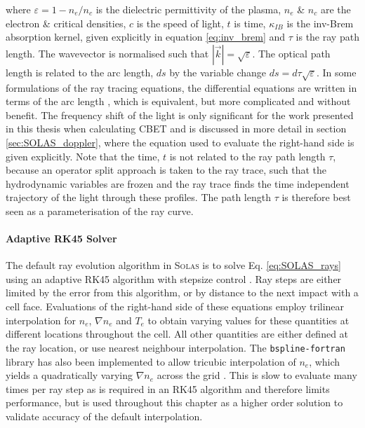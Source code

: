 where $\varepsilon=1-n_e/n_c$ is the dielectric permittivity of the plasma, $n_e$ \& $n_c$ are the electron \& critical densities, $c$ is the speed of light, $t$ is time, $\kappa_{IB}$ is the \ac{inv-Brem} absorption kernel, given explicitly in equation \ref{eq:inv_brem} and $\tau$ is the ray path length.
The wavevector is normalised such that $|\vec{k}|=\sqrt{\varepsilon}$.
The optical path length is related to the arc length, $ds$ by the variable change $ds=d\tau\sqrt{\varepsilon}$.
In some formulations of the ray tracing equations, the differential equations are written in terms of the arc length \cite{marozas_wavelength-detuning_2018,kaiser_laser_2000}, which is equivalent, but more complicated and without benefit.
The frequency shift of the light is only significant for the work presented in this thesis when calculating \ac{CBET} and is discussed in more detail in section \ref{sec:SOLAS_doppler}, where the equation used to evaluate the right-hand side is given explicitly.
Note that the time, $t$ is not related to the ray path length $\tau$, because an operator split approach is taken to the ray trace, such that the hydrodynamic variables are frozen and the ray trace finds the time independent trajectory of the light through these profiles.
The path length $\tau$ is therefore best seen as a parameterisation of the ray curve.

\paragraph*{Adaptive RK45 Solver}
The default ray evolution algorithm in \textsc{Solas} is to solve Eq. \ref{eq:SOLAS_rays} using an adaptive RK45 algorithm with stepsize control \cite{press_numerical_2007}.
Ray steps are either limited by the error from this algorithm, or by distance to the next impact with a cell face.
Evaluations of the right-hand side of these equations employ trilinear interpolation for $n_e$, $\nabla n_e$ and $T_e$ to obtain varying values for these quantities at different locations throughout the cell.
All other quantities are either defined at the ray location, or use nearest neighbour interpolation.
The \texttt{bspline-fortran} library has also been implemented to allow tricubic interpolation of $n_e$, which yields a quadratically varying $\nabla n_e$ across the grid \cite{williams_bspline-fortran_2024}.
This is slow to evaluate many times per ray step as is required in an RK45 algorithm and therefore limits performance, but is used throughout this chapter as a higher order solution to validate accuracy of the default interpolation.

